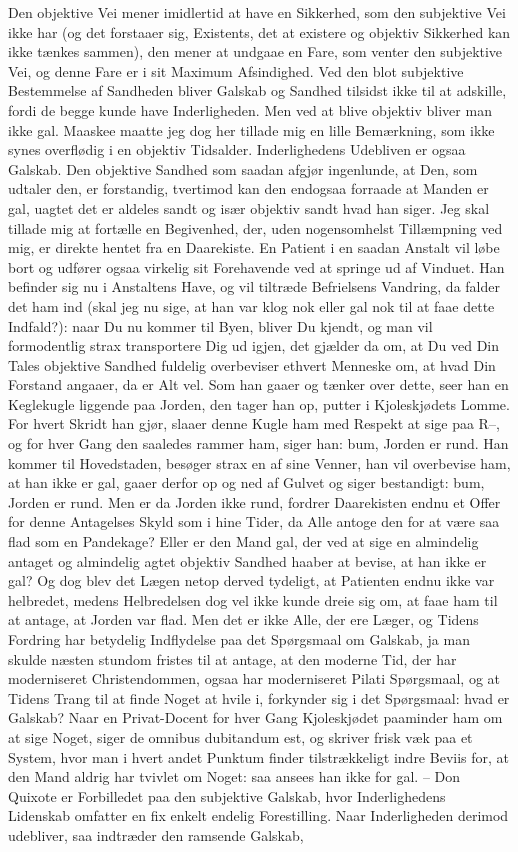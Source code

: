 \documentclass[12pt,a4paper]{article}
\begin{document}
Den objektive Vei mener imidlertid at have en Sikkerhed, som den subjektive Vei ikke har (og det forstaaer sig, Existents, det at existere og objektiv Sikkerhed kan ikke tænkes sammen), den mener at undgaae en Fare, som venter den subjektive Vei, og denne Fare er i sit Maximum Afsindighed. Ved den blot subjektive Bestemmelse af Sandheden bliver Galskab og Sandhed tilsidst ikke til at adskille, fordi de begge kunde have Inderligheden. Men ved at blive objektiv bliver man ikke gal. Maaskee maatte jeg dog her tillade mig en lille Bemærkning, som ikke synes overflødig i en objektiv Tidsalder. Inderlighedens Udebliven er ogsaa Galskab. Den objektive Sandhed som saadan afgjør ingenlunde, at Den, som udtaler den, er forstandig, tvertimod kan den endogsaa forraade at Manden er gal, uagtet det er aldeles sandt og især objektiv sandt hvad han siger. Jeg skal tillade mig at fortælle en Begivenhed, der, uden nogensomhelst Tillæmpning ved mig, er direkte hentet fra en Daarekiste. En Patient i en saadan Anstalt vil løbe bort og udfører ogsaa virkelig sit Forehavende ved at springe ud af Vinduet. Han befinder sig nu i Anstaltens Have, og vil tiltræde Befrielsens Vandring, da falder det ham ind (skal jeg nu sige, at han var klog nok eller gal nok til at faae dette Indfald?): naar Du nu kommer til Byen, bliver Du kjendt, og man vil formodentlig strax transportere Dig ud igjen, det gjælder da om, at Du ved Din Tales objektive Sandhed fuldelig overbeviser ethvert Menneske om, at hvad Din Forstand angaaer, da er Alt vel. Som han gaaer og tænker over dette, seer han en Keglekugle liggende paa Jorden, den tager han op, putter i Kjoleskjødets Lomme. For hvert Skridt han gjør, slaaer denne Kugle ham med Respekt at sige paa R–, og for hver Gang den saaledes rammer ham, siger han: bum, Jorden er rund. Han kommer til Hovedstaden, besøger strax en af sine Venner, han vil overbevise ham, at han ikke er gal, gaaer derfor op og ned af Gulvet og siger bestandigt: bum, Jorden er rund. Men er da Jorden ikke rund, fordrer Daarekisten endnu et Offer for denne Antagelses Skyld som i hine Tider, da Alle antoge den for at være saa flad som en Pandekage? Eller er den Mand gal, der ved at sige en almindelig antaget og almindelig agtet objektiv Sandhed haaber at bevise, at han ikke er gal? Og dog blev det Lægen netop derved tydeligt, at Patienten endnu ikke var helbredet, medens Helbredelsen dog vel ikke kunde dreie sig om, at faae ham til at antage, at Jorden var flad. Men det er ikke Alle, der ere Læger, og Tidens Fordring har betydelig Indflydelse paa det Spørgsmaal om Galskab, ja man skulde næsten stundom fristes til at antage, at den moderne Tid, der har moderniseret Christendommen, ogsaa har moderniseret Pilati Spørgsmaal, og at Tidens Trang til at finde Noget at hvile i, forkynder sig i det Spørgsmaal: hvad er Galskab? Naar en Privat-Docent for hver Gang Kjoleskjødet paaminder ham om at sige Noget, siger de omnibus dubitandum est, og skriver frisk væk paa et System, hvor man i hvert andet Punktum finder tilstrækkeligt indre Beviis for, at den Mand aldrig har tvivlet om Noget: saa ansees han ikke for gal. – Don Quixote er Forbilledet paa den subjektive Galskab, hvor Inderlighedens Lidenskab omfatter en fix enkelt endelig Forestilling. Naar Inderligheden derimod udebliver, saa indtræder den ramsende Galskab, 
\end{document}
